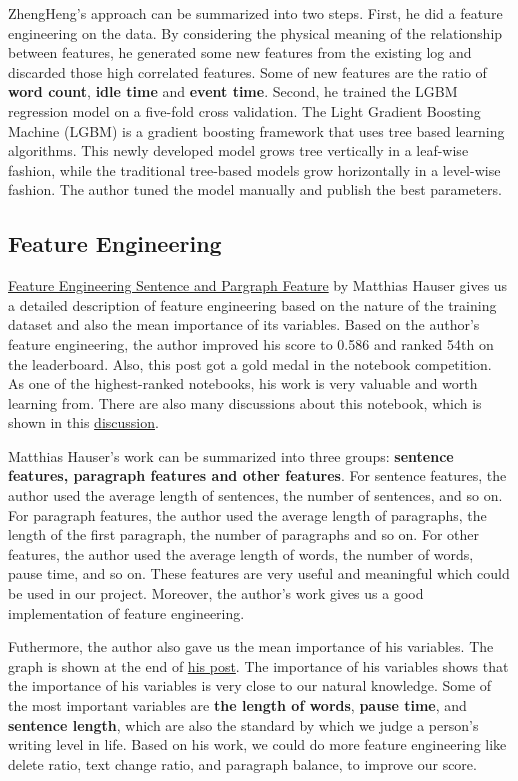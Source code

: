 \documentclass[8pt]{article}
\begin{document}
ZhengHeng's approach can be summarized into two steps. First, he did a feature engineering on the data. 
By considering the physical meaning of the relationship between features, he generated some new features from 
the existing log and discarded those high correlated features. Some of new features are the ratio of 
\textbf{word count}, \textbf{idle time} and \textbf{event time}. Second, he trained the LGBM regression model
on a five-fold cross validation. The Light Gradient Boosting Machine (LGBM) is a gradient boosting framework
that uses tree based learning algorithms. 
This newly developed model grows tree vertically in a leaf-wise fashion, while the traditional tree-based models
grow horizontally in a level-wise fashion. The author tuned the model manually and publish the best parameters. 

\subsection{Feature Engineering}
\href{https://www.kaggle.com/code/hiarsl/feature-engineering-sentence-paragraph-features}{Feature Engineering Sentence and Pargraph Feature} by Matthias Hauser
gives us a detailed description of feature engineering based on the nature of the training dataset and also the mean importance of its variables. Based on the author's feature engineering,
the author improved his score to 0.586 and ranked 54th on the leaderboard. Also, this post got a gold medal in the notebook competition. As one of the highest-ranked notebooks, 
his work is very valuable and worth learning from. There are also many discussions about this notebook, which is shown in this \href{https://www.kaggle.com/code/hiarsl/feature-engineering-sentence-paragraph-features/comments}{discussion}.

Matthias Hauser's work can be summarized into three groups: \textbf{sentence features, paragraph features and other features}. 
For sentence features, the author used the average length of sentences, the number of sentences, and so on. 
For paragraph features, the author used the average length of paragraphs, the length of the first paragraph, the number of paragraphs and so on.
For other features, the author used the average length of words, the number of words, pause time, and so on.
These features are very useful and meaningful which could be used in our project. Moreover, the author's work gives us a good implementation of feature engineering.

Futhermore, the author also gave us the mean importance of his variables. The graph is shown at the end of \href{https://www.kaggle.com/code/hiarsl/feature-engineering-sentence-paragraph-features/notebook}{his post}.
The importance of his variables shows that the importance of his variables is very close to our natural knowledge. Some of the most important variables are \textbf{the length of words}, \textbf{pause time}, and \textbf{sentence length}, which are also the standard by which we judge a person’s writing level in life.
Based on his work, we could do more feature engineering like delete ratio, text change ratio, and paragraph balance, to improve our score.
\end{document}
